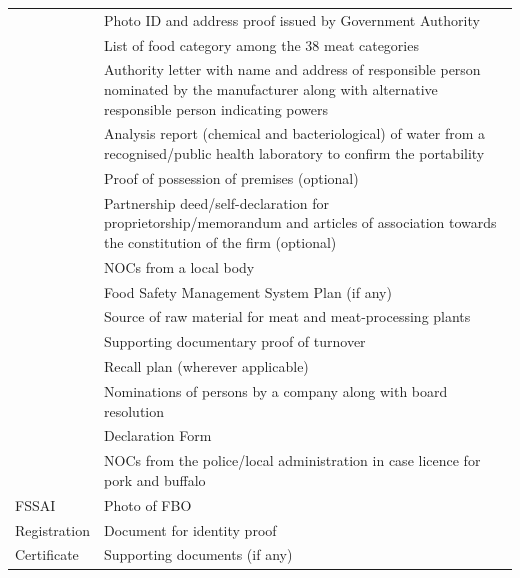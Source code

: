\documentclass[a4paper, 12pt]{article}
\begin{document}
\begin{longtable}{>{\raggedright}p{2.5cm}>{\raggedright\arraybackslash}p{13cm}}
    \multicolumn{1}{r}{} & Photo ID and address proof issued by Government Authority \\
    \multicolumn{1}{r}{} & List of food category among the 38 meat categories \\
    \multicolumn{1}{r}{} & Authority letter with name and address of responsible person nominated by the manufacturer along with alternative responsible person indicating powers   \\
    \multicolumn{1}{r}{} & Analysis report (chemical and bacteriological) of water from a recognised/public health laboratory to confirm the portability \\
    \multicolumn{1}{r}{} & Proof of possession of premises (optional) \\
    \multicolumn{1}{r}{} & Partnership deed/self-declaration for proprietorship/memorandum and articles of association towards the constitution of the firm (optional) \\
    \multicolumn{1}{r}{} & NOCs from a local body \\
    \multicolumn{1}{r}{} & Food Safety Management System Plan (if any) \\
    \multicolumn{1}{r}{} & Source of raw material for meat and meat-processing plants \\
    \multicolumn{1}{r}{} & Supporting documentary proof of turnover \\
    \multicolumn{1}{r}{} & Recall plan (wherever applicable) \\
    \multicolumn{1}{r}{} & Nominations of persons by a company along with board resolution \\
    \multicolumn{1}{r}{} & Declaration Form \\
    \multicolumn{1}{r}{} & NOCs from the police/local administration in case licence for pork and buffalo  \\
    \midrule
    FSSAI   & Photo of FBO \\
    Registration & Document for identity proof \\
    Certificate & Supporting documents (if any) \\
    \bottomrule
    \end{longtable}%
  \label{tab:addlabel}%
\normalsize  
  
\small


\end{document}
